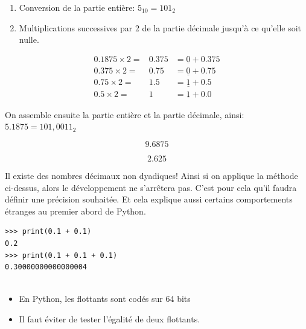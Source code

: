 	\bigskip

\begin{exemple}
\begin{enumerate}
	\item Conversion de la partie entière: $5_{10}=101_2$
	\item Multiplications successives par 2 de la partie décimale jusqu'à ce qu'elle soit nulle.
\end{enumerate}
	
\begin{eqnarray*}
0.1875 \times 2  = & 0.375 & =  \underline{0} + 0.375 \\
0.375 \times 2  = & 0.75 & =  \underline{0} + 0.75 \\
0.75 \times 2  = & 1.5 & =  \underline{1} + 0.5 \\
0.5 \times 2  = & 1  & =  \underline{1} + 0.0
\end{eqnarray*}

On assemble ensuite la partie entière et la partie décimale, ainsi: $5.1875 = 101,0011_2$

\end{exemple}  
\begin{exercice_cours}{}

	\begin{minipage}{8cm}
$$9.6875$$
\end{minipage}
\begin{minipage}{8cm}
$$2.625$$
\end{minipage}

\vspace{3cm}
	\end{exercice_cours}

	\begin{remarque}{\quad}{}

		Il existe des nombres décimaux non dyadiques! Ainsi si on applique la méthode ci-dessus, alors le développement ne s'arrêtera pas. C'est pour cela qu'il faudra définir une précision souhaitée. Et cela explique aussi certains comportements étranges au premier abord de Python.

	
	\end{remarque}

	\begin{lstlisting}
>>> print(0.1 + 0.1)
0.2
>>> print(0.1 + 0.1 + 0.1)
0.30000000000000004


\end{lstlisting}

\begin{itemize}
	\item En Python, les flottants sont codés sur 64 bits
	\item Il faut éviter de tester l'égalité de deux flottants. 
\end{itemize}

